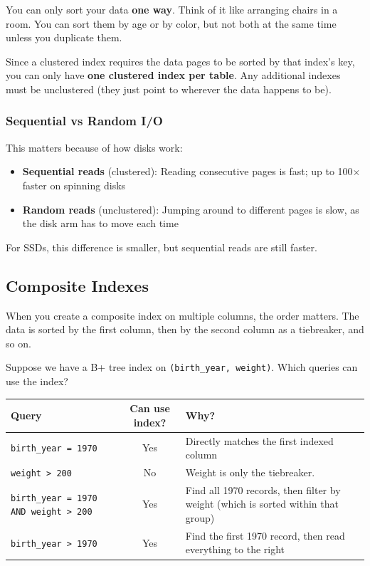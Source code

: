 You can only sort your data \textbf{one way}. Think of it like arranging chairs in a room. You can sort them by age or by color, but not both at the same time unless you duplicate them.

Since a clustered index requires the data pages to be sorted by that index's key, you can only have \textbf{one clustered index per table}. Any additional indexes must be unclustered (they just point to wherever the data happens to be).

\subsubsection*{Sequential vs Random I/O}

This matters because of how disks work:
\begin{itemize}
    \item \textbf{Sequential reads} (clustered): Reading consecutive pages is fast; up to 100$\times$ faster on spinning disks
    \item \textbf{Random reads} (unclustered): Jumping around to different pages is slow, as the disk arm has to move each time
\end{itemize}

For SSDs, this difference is smaller, but sequential reads are still faster.

\subsection{Composite Indexes}

When you create a composite index on multiple columns, the order matters. The data is sorted by the first column, then by the second column as a tiebreaker, and so on.

Suppose we have a B+ tree index on \texttt{(birth\_year, weight)}. Which queries can use the index?

\begin{table}[H]
    \centering
    \begin{tabular}{lcp{7cm}}
        \toprule
        \textbf{Query} & \textbf{Can use index?} & \textbf{Why?} \\
        \midrule
        \texttt{birth\_year = 1970} & Yes & Directly matches the first indexed column \\
        \texttt{weight > 200} & No & Weight is only the tiebreaker. \\
        \texttt{birth\_year = 1970 AND weight > 200} & Yes & Find all 1970 records, then filter by weight (which is sorted within that group) \\
        \texttt{birth\_year > 1970} & Yes & Find the first 1970 record, then read everything to the right \\
        \bottomrule
    \end{tabular}
\end{table}

